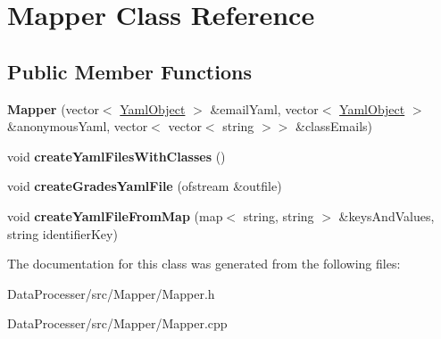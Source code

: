 \hypertarget{classMapper}{}\section{Mapper Class Reference}
\label{classMapper}
\subsection*{Public Member Functions}
\begin{DoxyCompactItemize}
\item 
\mbox{\label{classMapper_af544846befd0cad6dfd62667224f2443}} 
{\bfseries Mapper} (vector$<$ \hyperlink{classYamlObject}{Yaml\+Object} $>$ \&email\+Yaml, vector$<$ \hyperlink{classYamlObject}{Yaml\+Object} $>$ \&anonymous\+Yaml, vector$<$ vector$<$ string $>$$>$ \&class\+Emails)
\item 
\mbox{\label{classMapper_a93e9f23580b940a5a9d01abaa772163e}} 
void {\bfseries create\+Yaml\+Files\+With\+Classes} ()
\item 
\mbox{\label{classMapper_a8c097d98de06d34199ab1409a9598515}} 
void {\bfseries create\+Grades\+Yaml\+File} (ofstream \&outfile)
\item 
\mbox{\label{classMapper_a95d637dc7c5ef852920852167675cd00}} 
void {\bfseries create\+Yaml\+File\+From\+Map} (map$<$ string, string $>$ \&keys\+And\+Values, string identifier\+Key)
\end{DoxyCompactItemize}


The documentation for this class was generated from the following files\+:\begin{DoxyCompactItemize}
\item 
Data\+Processer/src/\+Mapper/Mapper.\+h\item 
Data\+Processer/src/\+Mapper/Mapper.\+cpp\end{DoxyCompactItemize}
